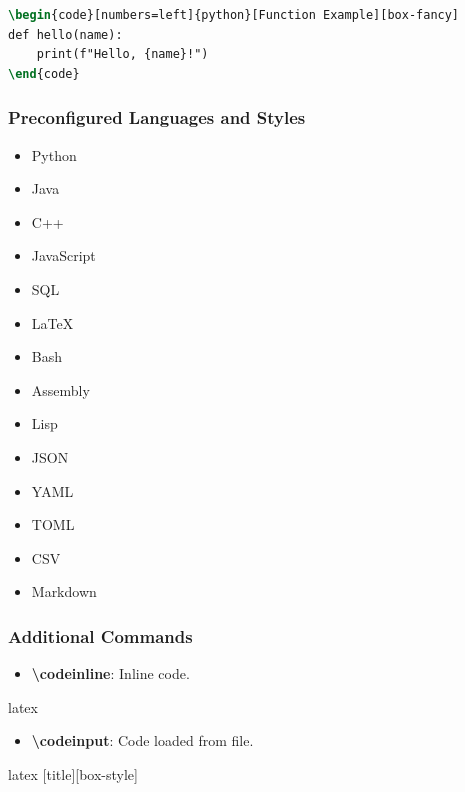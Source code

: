 \documentclass[
    margin=2cm
]{neoschool}
\begin{document}
\begin{lstlisting}[language=TeX]
\begin{code}[numbers=left]{python}[Function Example][box-fancy]
def hello(name):
    print(f"Hello, {name}!")
\end{code}
\end{lstlisting}

\subsubsection{Preconfigured Languages and
Styles}

\begin{itemize}
\item
  Python
\item
  Java
\item
  C++
\item
  JavaScript
\item
  SQL
\item
  LaTeX
\item
  Bash
\item
  Assembly
\item
  Lisp
\item
  JSON
\item
  YAML
\item
  TOML
\item
  CSV
\item
  Markdown
\end{itemize}

\subsubsection{Additional Commands}

\begin{itemize}
\item
  \textbf{\textbackslash codeinline}: Inline code.
\end{itemize}

\begin{code}{latex}
\end{code}

\begin{itemize}
\item
  \textbf{\textbackslash codeinput}: Code loaded from file.
\end{itemize}

\begin{code}{latex}
[title][box-style]
\end{code}
\end{document}
